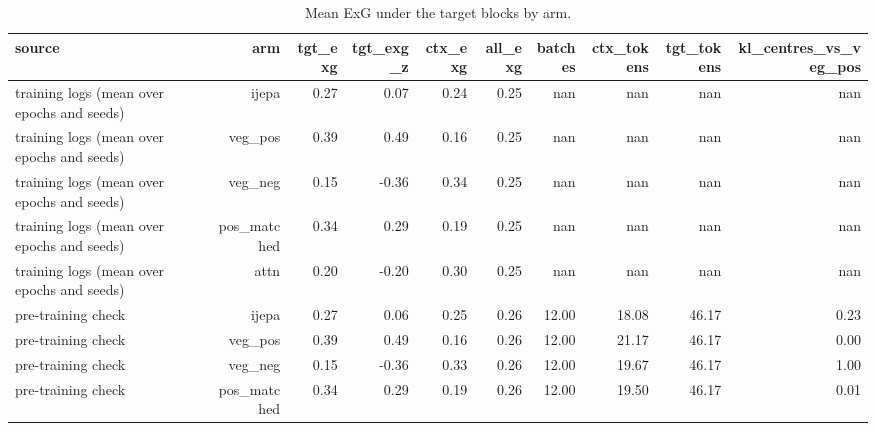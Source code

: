 \begin{table}[t]
\centering
\small
\caption{Mean ExG under the target blocks by arm.}
\label{tab:manipulation_check}
\begin{tabular}{lrrrrrrrrr}
\toprule
source & arm & tgt\_exg & tgt\_exg\_z & ctx\_exg & all\_exg & batches & ctx\_tokens & tgt\_tokens & kl\_centres\_vs\_veg\_pos \\
\midrule
training logs (mean over epochs and seeds) & ijepa & 0.27 & 0.07 & 0.24 & 0.25 & nan & nan & nan & nan \\
training logs (mean over epochs and seeds) & veg\_pos & 0.39 & 0.49 & 0.16 & 0.25 & nan & nan & nan & nan \\
training logs (mean over epochs and seeds) & veg\_neg & 0.15 & -0.36 & 0.34 & 0.25 & nan & nan & nan & nan \\
training logs (mean over epochs and seeds) & pos\_matched & 0.34 & 0.29 & 0.19 & 0.25 & nan & nan & nan & nan \\
training logs (mean over epochs and seeds) & attn & 0.20 & -0.20 & 0.30 & 0.25 & nan & nan & nan & nan \\
pre-training check & ijepa & 0.27 & 0.06 & 0.25 & 0.26 & 12.00 & 18.08 & 46.17 & 0.23 \\
pre-training check & veg\_pos & 0.39 & 0.49 & 0.16 & 0.26 & 12.00 & 21.17 & 46.17 & 0.00 \\
pre-training check & veg\_neg & 0.15 & -0.36 & 0.33 & 0.26 & 12.00 & 19.67 & 46.17 & 1.00 \\
pre-training check & pos\_matched & 0.34 & 0.29 & 0.19 & 0.26 & 12.00 & 19.50 & 46.17 & 0.01 \\
\bottomrule
\end{tabular}
\end{table}
